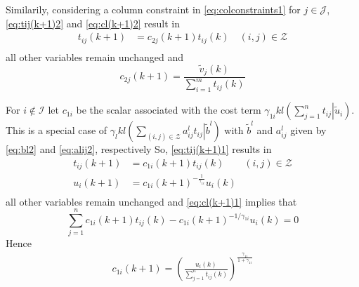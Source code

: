 \documentclass[twocolumn]{article}
\begin{document}
Similarily, 
considering  a column constraint  in \eqref{eq:colconstraints1} for $j \in \mathcal{J}$,
\eqref{eq:tij(k+1)2} and \eqref{eq:cl(k+1)2}  result in
 \begin{equation}
\label{eq:lem5result}
\begin{aligned}
t_{ij}(k+1) &= c_{2j}(k+1)  t_{ij}(k) \quad (i, j) \in {\mathcal Z}\\
\end{aligned}
\end{equation}
all other variables remain unchanged and
\begin{equation}
\label{eq:c2j1}
 c_{2j}(k+1)= \frac{\tilde{v}_j(k)}{\sum_{i=1}^m t_{ij}(k)}
\end{equation}

For  $i \notin \mathcal{I}$ let $c_{1i}$
be the 
scalar associated with the cost term
$\gamma_{1i} kl\left(\left. \sum_{j=1}^n  t_{ij} \right| \tilde{u}_i\right)$.
This is a special case of 
$\gamma_l kl\left( \sum_{(i,j) \in {\mathcal Z}} 
\left. a^l_{ij} t_{ij}\right|\tilde{b}^l  \right)$
with
$\tilde{b}^l$ and $a^l_{ij}$ given by \eqref{eq:bl2} and \eqref{eq:alij2}, respectively
So,
\eqref{eq:tij(k+1)1}  results in
\begin{equation}
\label{eq:lem4result}
\begin{aligned}
t_{ij}(k+1) &= c_{1i}(k+1)  t_{ij}(k) \qquad (i, j) \in {\mathcal Z}\\
u_i(k+1) &= c_{1i}(k+1)^{-\frac{1}{\gamma_{1i}} }u_i(k)	\\
\end{aligned}
\end{equation}
all other variables remain unchanged and  \eqref{eq:cl(k+1)1} implies that
\begin{equation*}
 \sum_{j=1}^nc_{1i}(k+1)t_{ij}(k) - c_{1i}(k+1)^{-1/\gamma_{1i} }u_i(k) =0
\end{equation*}
Hence
\begin{align}
\label{eq:c2j0}
c_{1i}(k+1)= \left(\frac{u_i(k)}{\sum_{j=1}^n t_{ij}(k)}\right)^\frac{\gamma_{1i}}{1+\gamma_{1i} }
\end{align}
\end{document}
